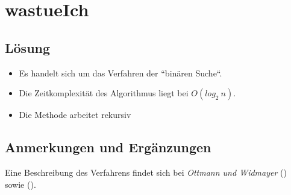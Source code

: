 \chapter{wastueIch}

\section*{Lösung}

\begin{itemize}
    \item Es handelt sich um das Verfahren der ``binären Suche``.
    \item Die Zeitkomplexität des Algorithmus liegt bei $O(log_2\ n)$.
    \item Die Methode arbeitet rekursiv
\end{itemize}


\section*{Anmerkungen und Ergänzungen}

Eine Beschreibung des Verfahrens findet sich bei \textit{Ottmann und Widmayer} (\cite[174]{OW17c}) sowie  (\cite[17]{GD18a}).